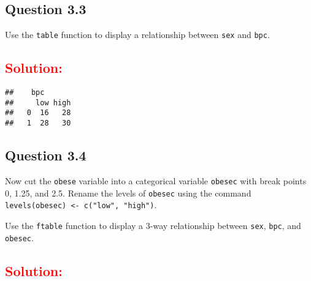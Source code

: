 \documentclass[]{article}
\newenvironment{Shaded}{\begin{snugshade}}{\end{snugshade}}
\newcommand{\KeywordTok}[1]{\textcolor[rgb]{0.13,0.29,0.53}{\textbf{#1}}}
\newcommand{\DataTypeTok}[1]{\textcolor[rgb]{0.13,0.29,0.53}{#1}}
\newcommand{\DecValTok}[1]{\textcolor[rgb]{0.00,0.00,0.81}{#1}}
\newcommand{\StringTok}[1]{\textcolor[rgb]{0.31,0.60,0.02}{#1}}
\newcommand{\OperatorTok}[1]{\textcolor[rgb]{0.81,0.36,0.00}{\textbf{#1}}}
\newcommand{\NormalTok}[1]{#1}
\begin{document}
\begin{Shaded}
\end{Shaded}

\subsection{Question 3.3}\label{question-3.3}

Use the \texttt{table} function to display a relationship between
\texttt{sex} and \texttt{bpc}.

\subsection{\texorpdfstring{\textcolor{red}{Solution:}}{}}\label{section-10}

\begin{Shaded}
\end{Shaded}

\begin{verbatim}
##    bpc
##     low high
##   0  16   28
##   1  28   30
\end{verbatim}

\subsection{Question 3.4}\label{question-3.4}

Now cut the \texttt{obese} variable into a categorical variable
\texttt{obesec} with break points 0, 1.25, and 2.5. Rename the levels of
\texttt{obesec} using the command
\texttt{levels(obesec)\ \textless{}-\ c("low",\ "high")}.

Use the \texttt{ftable} function to display a 3-way relationship between
\texttt{sex}, \texttt{bpc}, and \texttt{obesec}.

\subsection{\texorpdfstring{\textcolor{red}{Solution:}}{}}\label{section-11}
\end{document}
